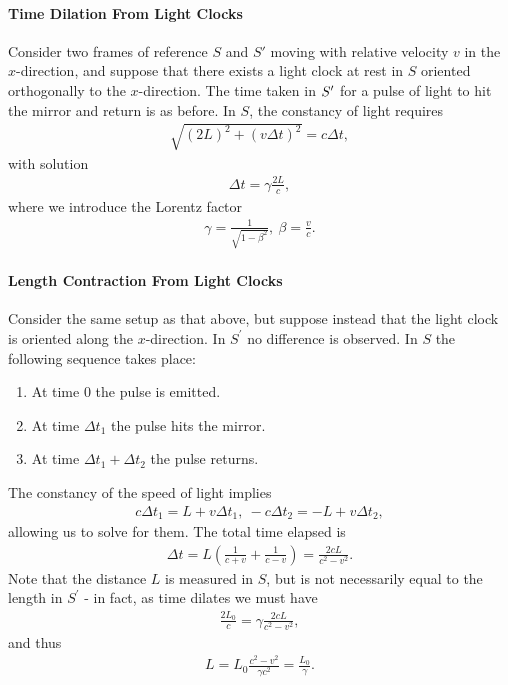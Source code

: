 \paragraph{Time Dilation From Light Clocks}
Consider two frames of reference $S$ and $S'$ moving with relative velocity $v$ in the $x$-direction, and suppose that there exists a light clock at rest in $S$ oriented orthogonally to the $x$-direction. The time taken in $S^{\prime}$ for a pulse of light to hit the mirror and return is as before. In $S$, the constancy of light requires
\begin{align*}
	\sqrt{(2L)^{2} + (v\Delta t)^{2}} = c\Delta t,
\end{align*}
with solution
\begin{align*}
	\Delta t = \gamma\frac{2L}{c},
\end{align*}
where we introduce the Lorentz factor
\begin{align*}
	\gamma = \frac{1}{\sqrt{1 - \beta^{2}}},\ \beta = \frac{v}{c}.
\end{align*}

\paragraph{Length Contraction From Light Clocks}
Consider the same setup as that above, but suppose instead that the light clock is oriented along the $x$-direction. In $S^{\prime}$ no difference is observed. In $S$ the following sequence takes place:
\begin{enumerate}
	\item At time $0$ the pulse is emitted.
	\item At time $\Delta t_{1}$ the pulse hits the mirror.
	\item At time $\Delta t_{1} + \Delta t_{2}$ the pulse returns.
\end{enumerate}
The constancy of the speed of light implies
\begin{align*}
	c\Delta t_{1} = L + v\Delta t_{1},\ -c\Delta t_{2} = -L + v\Delta t_{2},
\end{align*}
allowing us to solve for them. The total time elapsed is
\begin{align*}
	\Delta t = L\left(\frac{1}{c + v} + \frac{1}{c - v}\right) = \frac{2cL}{c^{2} - v^{2}}.
\end{align*}
Note that the distance $L$ is measured in $S$, but is not necessarily equal to the length in $S^{\prime}$ - in fact, as time dilates we must have
\begin{align*}
	\frac{2L_{0}}{c} = \gamma\frac{2cL}{c^{2} - v^{2}},
\end{align*}
and thus
\begin{align*}
	L = L_{0}\frac{c^{2} - v^{2}}{\gamma c^{2}} = \frac{L_{0}}{\gamma}.
\end{align*}

